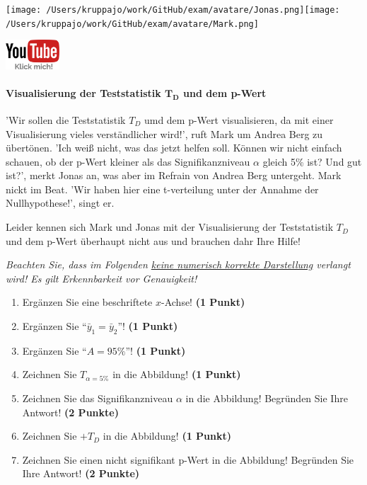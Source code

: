 \documentclass[a4paper, 9pt]{scrartcl}\usepackage[]{graphicx}\usepackage[]{xcolor}
\begin{document}
 
\begin{minipage}[t]{0.5\textwidth}
\texttt{[image: /Users/kruppajo/work/GitHub/exam/avatare/Jonas.png]}\hspace{-4mm}\texttt{[image: /Users/kruppajo/work/GitHub/exam/avatare/Mark.png]}
\end{minipage}
\begin{minipage}[t]{0.5\textwidth}
\hfill
\href{https://youtu.be/32JjH1eyuTU}{\includegraphics[width = 2cm]{img/youtube}}
\end{minipage}



\paragraph{Visualisierung der Teststatistik $\boldsymbol{T_D}$ und dem p-Wert}

'Wir sollen die Teststatistik $T_D$ umd dem p-Wert visualisieren, da mit einer Visualisierung vieles verständlicher wird!', ruft Mark um Andrea Berg zu übertönen. 'Ich weiß nicht, was das jetzt helfen soll. Können wir nicht einfach schauen, ob der p-Wert kleiner als das Signifikanzniveau  $\alpha$ gleich 5\% ist? Und gut ist?', merkt Jonas an, was aber im Refrain von Andrea Berg untergeht. Mark nickt im Beat. 'Wir haben hier eine t-verteilung unter der Annahme der Nullhypothese!', singt er.

\vspace{1ex}

Leider kennen sich Mark und Jonas mit der Visualisierung der Teststatistik $T_D$ und dem p-Wert überhaupt nicht aus und brauchen dahr Ihre Hilfe!

\vspace{1ex}

\textit{Beachten Sie, dass im Folgenden \underline{keine numerisch korrekte Darstellung} verlangt wird! Es gilt Erkennbarkeit vor Genauigkeit!}

\begin{enumerate}
\item Ergänzen Sie eine beschriftete $x$-Achse! \textbf{(1 Punkt)}
\item Ergänzen Sie "`$\bar{y}_1 = \bar{y}_2$"'! \textbf{(1 Punkt)} 
\item Ergänzen Sie "`$A = 95\%$"'! \textbf{(1 Punkt)}
\item Zeichnen Sie $T_{\alpha=5\%}$ in die Abbildung! \textbf{(1 Punkt)} 
\item Zeichnen Sie das Signifikanzniveau $\alpha$ in die Abbildung! Begründen Sie Ihre Antwort! \textbf{(2 Punkte)} 
\item Zeichnen Sie $+T_{D}$ in die Abbildung! \textbf{(1 Punkt)}
\item Zeichnen Sie einen nicht signifikant p-Wert in die Abbildung! Begründen Sie Ihre Antwort! \textbf{(2 Punkte)}   
\end{enumerate}
\end{document}
